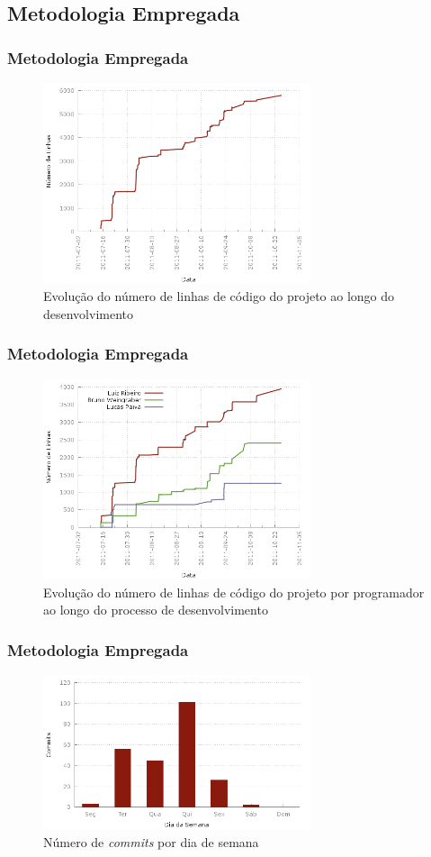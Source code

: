 \subsection{Metodologia Empregada}
\frame
{
\frametitle{Metodologia Empregada}
\begin{figure}
\includegraphics[width=0.7\textwidth]{./imgs/lines_of_code.png}
\caption{Evolução do número de linhas de código do projeto ao longo do desenvolvimento}
\end{figure}
}

\frame
{
\frametitle{Metodologia Empregada}
\begin{figure}
\includegraphics[width=0.7\textwidth]{./imgs/lines_of_code_by_author.png}
\caption{Evolução do número de linhas de código do projeto por programador ao longo do processo de desenvolvimento}
\end{figure}
}

\frame
{
\frametitle{Metodologia Empregada}
\begin{figure}
\includegraphics[width=0.7\textwidth]{./imgs/day_of_week.png}
\caption{Número de \emph{commits} por dia de semana}
\end{figure}


}

